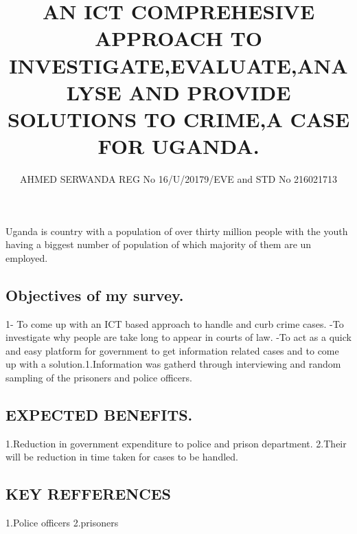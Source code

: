 \documentclass[12pt]{article}
\begin{document}
\title{AN ICT COMPREHESIVE APPROACH TO INVESTIGATE,EVALUATE,ANALYSE AND PROVIDE SOLUTIONS TO CRIME,A CASE FOR UGANDA.}
\author{AHMED SERWANDA
       REG No 16/U/20179/EVE and STD No 216021713}
\maketitle
\begin{section}
Uganda is country with a population of over thirty million people with the youth having a biggest number of population of which majority of them are un employed.

 \section{Objectives of my survey.}
1-	To come up with an ICT based approach to handle and curb crime cases.
-To investigate why people are take long to appear in courts of law.
-To  act as a quick and easy platform for government to get information related cases and to come up with a solution.\newline 1.Information was gatherd through interviewing and random sampling of the prisoners and police officers.
     
     
     \section{EXPECTED BENEFITS.}
1.Reduction in government expenditure to police and prison department.
\newline 2.Their will be reduction in time taken for cases to be handled.
  
 \section{KEY REFFERENCES}
1.Police officers
\newline 2.prisoners
  
 \end{section}
 
\end{document}

